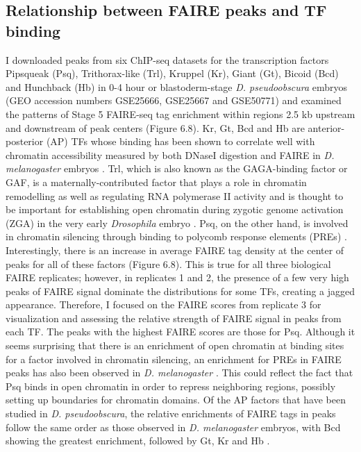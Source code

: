 \subsection{Relationship between FAIRE peaks and TF binding}
I downloaded peaks from six ChIP-seq datasets for the transcription factors Pipsqueak (Psq), Trithorax-like (Trl), Kruppel (Kr), Giant (Gt), Bicoid (Bcd) and Hunchback (Hb) in 0-4 hour or blastoderm-stage \emph{D. pseudoobscura} embryos (GEO accession numbers GSE25666, GSE25667 and GSE50771) and examined the patterns of Stage 5 FAIRE-seq tag enrichment within regions 2.5 kb upstream and downstream of peak centers (Figure 6.8). Kr, Gt, Bcd and Hb are anterior-posterior (AP) TFs whose binding has been shown to correlate well with chromatin accessibility measured by both DNaseI digestion and FAIRE in \emph{D. melanogaster} embryos \citep{mckay_common_2013,li_role_2011}. Trl, which is also known as the GAGA-binding factor or GAF, is a maternally-contributed factor that plays a role in chromatin remodelling as well as regulating RNA polymerase II activity and is thought to be important for establishing open chromatin during zygotic genome activation (ZGA) in the very early \emph{Drosophila} embryo \citep{darbo_transcriptional_2013}. Psq, on the other hand, is involved in chromatin silencing through binding to polycomb response elements (PREs) \citep{huang_pipsqueak_2002}. Interestingly, there is an increase in average FAIRE tag density at the center of peaks for all of these factors (Figure 6.8). This is true for all three biological FAIRE replicates; however, in replicates 1 and 2, the presence of a few very high peaks of FAIRE signal dominate the distributions for some TFs, creating a jagged appearance. Therefore, I focused on the FAIRE scores from replicate 3 for visualization and assessing the relative strength of FAIRE signal in peaks from each TF. The peaks with the highest FAIRE scores are those for Psq. Although it seems surprising that there is an enrichment of open chromatin at binding sites for a factor involved in chromatin silencing, an enrichment for PREs in FAIRE peaks has also been observed in \emph{D. melanogaster} \citep{mckay_common_2013}. This could reflect the fact that Psq binds in open chromatin in order to repress neighboring regions, possibly setting up boundaries for chromatin domains. Of the AP factors that have been studied in \emph{D. pseudoobscura}, the relative enrichments of FAIRE tags in peaks follow the same order as those observed in \emph{D. melanogaster} embryos, with Bcd showing the greatest enrichment, followed by Gt, Kr and Hb \citep{mckay_common_2013}.

